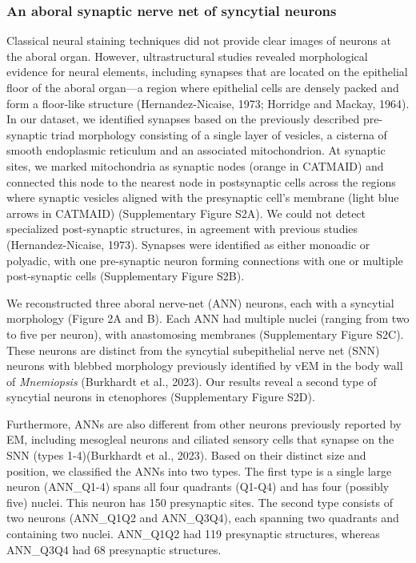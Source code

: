 \documentclass[
  11pt,
]{article}
\begin{document}
\subsubsection{An aboral synaptic nerve net of syncytial
neurons}\label{an-aboral-synaptic-nerve-net-of-syncytial-neurons}

Classical neural staining techniques did not provide clear images of
neurons at the aboral organ. However, ultrastructural studies revealed
morphological evidence for neural elements, including synapses that are
located on the epithelial floor of the aboral organ---a region where
epithelial cells are densely packed and form a floor-like structure
(Hernandez-Nicaise, 1973; Horridge and Mackay, 1964). In our dataset, we
identified synapses based on the previously described pre-synaptic triad
morphology consisting of a single layer of vesicles, a cisterna of
smooth endoplasmic reticulum and an associated mitochondrion. At
synaptic sites, we marked mitochondria as synaptic nodes (orange in
CATMAID) and connected this node to the nearest node in postsynaptic
cells across the regions where synaptic vesicles aligned with the
presynaptic cell's membrane (light blue arrows in CATMAID)
(Supplementary Figure S2A). We could not detect specialized
post-synaptic structures, in agreement with previous studies
(Hernandez-Nicaise, 1973). Synapses were identified as either monoadic
or polyadic, with one pre-synaptic neuron forming connections with one
or multiple post-synaptic cells (Supplementary Figure S2B).

We reconstructed three aboral nerve-net (ANN) neurons, each with a
syncytial morphology (Figure 2A and B). Each ANN had multiple nuclei
(ranging from two to five per neuron), with anastomosing membranes
(Supplementary Figure S2C). These neurons are distinct from the
syncytial subepithelial nerve net (SNN) neurons with blebbed morphology
previously identified by vEM in the body wall of \emph{Mnemiopsis}
(Burkhardt et al., 2023). Our results reveal a second type of syncytial
neurons in ctenophores (Supplementary Figure S2D).

Furthermore, ANNs are also different from other neurons previously
reported by EM, including mesogleal neurons and ciliated sensory cells
that synapse on the SNN (types 1-4)(Burkhardt et al., 2023). Based on
their distinct size and position, we classified the ANNs into two types.
The first type is a single large neuron (ANN\_Q1-4) spans all four
quadrants (Q1-Q4) and has four (possibly five) nuclei. This neuron has
150 presynaptic sites. The second type consists of two neurons
(ANN\_Q1Q2 and ANN\_Q3Q4), each spanning two quadrants and containing
two nuclei. ANN\_Q1Q2 had 119 presynaptic structures, whereas ANN\_Q3Q4
had 68 presynaptic structures.
\end{document}
